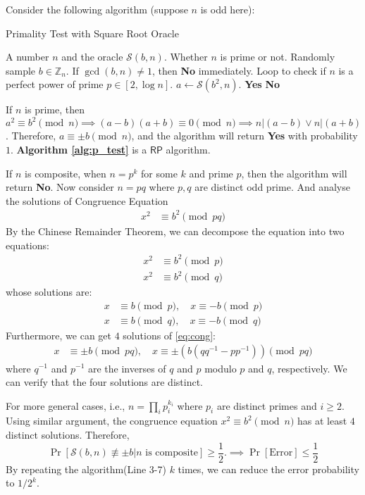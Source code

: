 \begin{answer}
	Consider the following algorithm (suppose $n$ is odd here):
	\begin{algo}
		\centering
		\caption{Primality Test with Square Root Oracle}
		\label{alg:p_test}
		\begin{algorithmic}[1]
			\Require A number $n$ and the oracle $\mathcal S(b,n)$.
			\Ensure Whether $n$ is prime or not.
			\State Randomly sample $b \in \mathbb{Z}_n$. If $\gcd(b,n) \neq 1$, then \Return \textbf{No} immediately.
			\State Loop to check if $n$ is a perfect power of prime $p \in [2, \log n]$.  
			\State $a \leftarrow \mathcal S(b^2,n)$.
				\State \Return \textbf{Yes}
			\Else
				\State \Return \textbf{No}
			\EndIf
		\end{algorithmic}
	\end{algo}
	If $n$ is prime, then $a^2 \equiv b^2 \pmod{n} \implies (a-b)(a+b) \equiv 0 \pmod{n} \implies n|(a-b) \lor n|(a+b)$. 
	Therefore, $a \equiv \pm b \pmod{n}$, and the algorithm will return \textbf{Yes} with probability $1$. 
	\textbf{Algorithm \ref{alg:p_test}} is a $\mathsf{RP}$ algorithm.

	If $n$ is composite,  when $n = p^k$ for some $k$ and prime $p$, then the algorithm will return \textbf{No}. 
	Now consider $ n = pq$ where $p,q$ are distinct odd prime. And analyse the solutions of Congruence Equation 
	\begin{align}
		\label{eq:cong}
		x^2 &\equiv b^2 \pmod{pq} 
	\end{align}
	By the Chinese Remainder Theorem, we can decompose the equation into two equations:
	\begin{align*}
		x^2 &\equiv b^2 \pmod{p} \\
		x^2 &\equiv b^2 \pmod{q}
	\end{align*}
	whose solutions are:
	\begin{align*}
		x &\equiv b \pmod{p}, \quad x \equiv -b \pmod{p} \\
		x &\equiv b \pmod{q}, \quad x \equiv -b \pmod{q}
	\end{align*}
	Furthermore, we can get $4$ solutions of \eqref{eq:cong}:
	\begin{align*}
		x &\equiv \pm b \pmod{pq}, \quad x \equiv \pm (b(qq^{-1} - pp^{-1})) \pmod{pq} 
	\end{align*}
	where $q^{-1}$ and $p^{-1}$ are the inverses of $q$ and $p$ modulo $p$ and $q$, respectively.
	We can verify that the four solutions are distinct. 

	For more general cases, i.e., $n = \prod_i p_i^{k_i}$ where $p_i$ are distinct primes and $i \ge 2$. 
	Using similar argument, the congruence equation $x^2 \equiv b^2 \pmod{n}$ has at least $4$ distinct solutions.
	Therefore, 
	\[
		\Pr[\mathcal S(b,n) \not\equiv \pm b | n \text{ is composite}] \ge \frac{1}{2}. \implies \Pr[\text{Error}] \le \frac{1}{2}
	\]
	By repeating the algorithm(Line 3-7) $k$ times, we can reduce the error probability to $1/2^k$.
	\ed 
\end{answer}